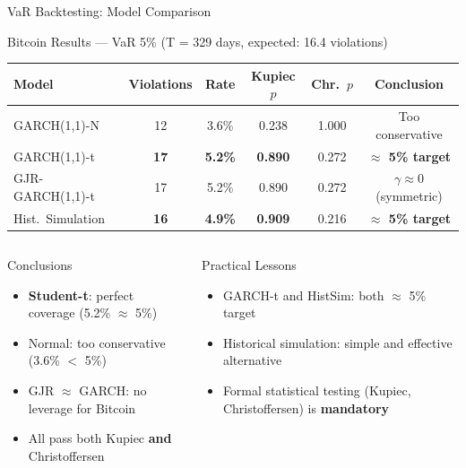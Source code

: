 \documentclass[9pt, aspectratio=169, t]{beamer}
\begin{document}
\begin{frame}{VaR Backtesting: Model Comparison}
    \vspace{-0.1cm}
    {\footnotesize
    \begin{block}{Bitcoin Results --- VaR 5\% (T = 329 days, expected: 16.4 violations)}
        \begin{center}
        \begin{tabular}{lccccc}
            \toprule
            \textbf{Model} & \textbf{Violations} & \textbf{Rate} & \textbf{Kupiec $p$} & \textbf{Chr.\ $p$} & \textbf{Conclusion} \\
            \midrule
            GARCH(1,1)-N & 12 & 3.6\% & 0.238 & 1.000 & Too conservative \\
            \rowcolor{Forest!15} GARCH(1,1)-t & \textbf{17} & \textbf{5.2\%} & \textbf{0.890} & 0.272 & \textcolor{Forest}{\textbf{$\approx$ 5\% target}} \\
            GJR-GARCH(1,1)-t & 17 & 5.2\% & 0.890 & 0.272 & $\gamma \approx 0$ (symmetric) \\
            \rowcolor{Forest!15} Hist.\ Simulation & \textbf{16} & \textbf{4.9\%} & \textbf{0.909} & 0.216 & \textcolor{Forest}{\textbf{$\approx$ 5\% target}} \\
            \bottomrule
        \end{tabular}
        \end{center}
    \end{block}
    }

    \vspace{0.1cm}

    \begin{columns}[T]
        \begin{exampleblock}{Conclusions}
            \begin{itemize}\setlength{\itemsep}{0pt}
                \item \textbf{Student-t}: perfect coverage (5.2\% $\approx$ 5\%)
                \item Normal: too conservative (3.6\% $<$ 5\%)
                \item GJR $\approx$ GARCH: no leverage for Bitcoin
                \item All pass both Kupiec \textbf{and} Christoffersen
            \end{itemize}
        \end{exampleblock}

        \begin{alertblock}{Practical Lessons}
            \begin{itemize}\setlength{\itemsep}{0pt}
                \item GARCH-t and HistSim: both $\approx$ 5\% target
                \item Historical simulation: simple and effective alternative
                \item Formal statistical testing (Kupiec, Christoffersen) is \textbf{mandatory}
            \end{itemize}
        \end{alertblock}
    \end{columns}
\end{frame}
\end{document}
